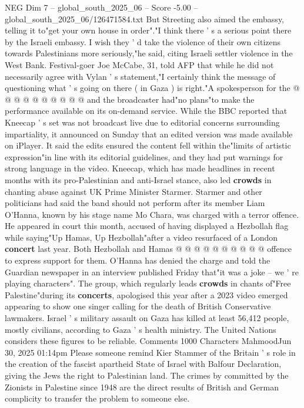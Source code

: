 \begin{textsample}{NEG Dim 7 – global\_south\_2025\_06 – Score -5.00 – global\_south\_2025\_06/126471584.txt}
But Streeting also aimed the embassy, telling it to"get your own house in order"."I think there ' s a serious point there by the Israeli embassy.
I wish they ' d take the violence of their own citizens towards Palestinians more seriously,"he said, citing Israeli settler violence in the West Bank.
Festival-goer Joe McCabe, 31, told AFP that while he did not necessarily agree with Vylan ' s statement,"I certainly think the message of questioning what ' s going on there ( in Gaza ) is right."A spokesperson for the @ @ @ @ @ @ @ @ @ @ and the broadcaster had"no plans"to make the performance available on its on-demand service.
While the BBC reported that Kneecap ' s set was not broadcast live due to editorial concerns surrounding impartiality, it announced on Sunday that an edited version was made available on iPlayer.
It said the edits ensured the content fell within the"limits of artistic expression"in line with its editorial guidelines, and they had put warnings for strong language in the video.
Kneecap, which has made headlines in recent months with its pro-Palestinian and anti-Israel stance, also led \textbf{crowds} in chanting abuse against UK Prime Minister Starmer.
Starmer and other politicians had said the band should not perform after its member Liam O'Hanna, known by his stage name Mo Chara, was charged with a terror offence.
He appeared in court this month, accused of having displayed a Hezbollah flag while saying"Up Hamas, Up Hezbollah"after a video resurfaced of a London \textbf{concert} last year.
Both Hezbollah and Hamas @ @ @ @ @ @ @ @ @ @ offence to express support for them.
O'Hanna has denied the charge and told the Guardian newspaper in an interview published Friday that"it was a joke -- we ' re playing characters".
The group, which regularly leads \textbf{crowds} in chants of"Free Palestine"during its \textbf{concerts}, apologised this year after a 2023 video emerged appearing to show one singer calling for the death of British Conservative lawmakers.
Israel ' s military assault on Gaza has killed at least 56,412 people, mostly civilians, according to Gaza ' s health ministry.
The United Nations considers these figures to be reliable.
Comments 1000 Characters MahmoodJun 30, 2025 01:14pm Please someone remind Kier Stammer of the Britain ' s role in the creation of the fascist apartheid State of Israel with Balfour Declaration, giving the Jews the right to Palestinian land.
The crimes by committed by the Zionists in Palestine since 1948 are the direct results of British and German complicity to transfer the problem to someone else.

\end{textsample}

